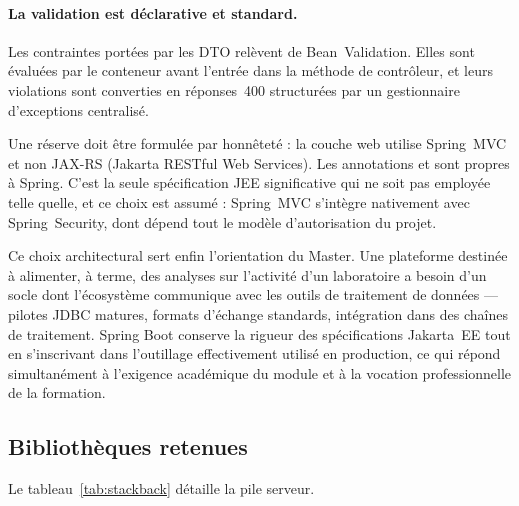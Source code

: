 \paragraph{La validation est déclarative et standard.} Les contraintes portées par les DTO
relèvent de Bean~Validation. Elles sont évaluées par le conteneur avant l'entrée dans la
méthode de contrôleur, et leurs violations sont converties en réponses~400 structurées par
un gestionnaire d'exceptions centralisé.

Une réserve doit être formulée par honnêteté : la couche web utilise Spring~MVC et non
JAX-RS (Jakarta RESTful Web Services). Les annotations  et
 sont propres à Spring. C'est la seule spécification JEE significative
qui ne soit pas employée telle quelle, et ce choix est assumé : Spring~MVC s'intègre
nativement avec Spring~Security, dont dépend tout le modèle d'autorisation du projet.

Ce choix architectural sert enfin l'orientation du Master. Une plateforme destinée à
alimenter, à terme, des analyses sur l'activité d'un laboratoire a besoin d'un socle dont
l'écosystème communique avec les outils de traitement de données --- pilotes JDBC
matures, formats d'échange standards, intégration dans des chaînes de traitement. Spring
Boot conserve la rigueur des spécifications Jakarta~EE tout en s'inscrivant dans
l'outillage effectivement utilisé en production, ce qui répond simultanément à l'exigence
académique du module et à la vocation professionnelle de la formation.

\subsection{Bibliothèques retenues}

Le tableau~\ref{tab:stackback} détaille la pile serveur.

